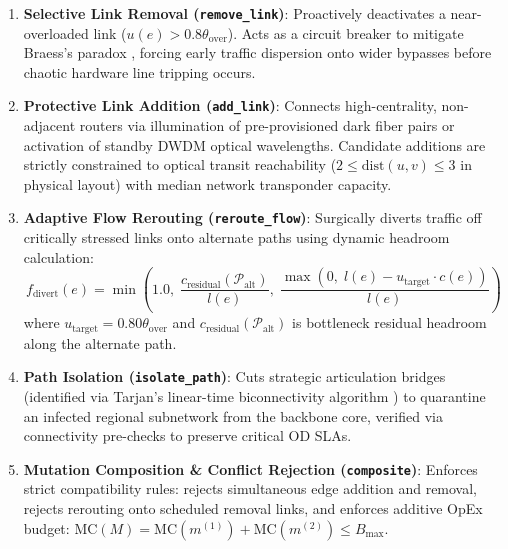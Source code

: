 \documentclass[pdflatex,sn-mathphys-num]{sn-jnl}
\theoremstyle{thmstyleone}
\theoremstyle{thmstyletwo}
\theoremstyle{thmstylethree}
\begin{document}
\begin{enumerate}
    \item \textbf{Selective Link Removal (\texttt{remove\_link})}: Proactively deactivates a near-overloaded link ($u(e) > 0.8 \theta_{\mathrm{over}}$). Acts as a circuit breaker to mitigate Braess's paradox \cite{roughgarden2002bad}, forcing early traffic dispersion onto wider bypasses before chaotic hardware line tripping occurs.
    \item \textbf{Protective Link Addition (\texttt{add\_link})}: Connects high-centrality, non-adjacent routers via illumination of pre-provisioned dark fiber pairs or activation of standby DWDM optical wavelengths. Candidate additions are strictly constrained to optical transit reachability ($2 \le \mathrm{dist}(u, v) \le 3$ in physical layout) with median network transponder capacity.
    \item \textbf{Adaptive Flow Rerouting (\texttt{reroute\_flow})}: Surgically diverts traffic off critically stressed links onto alternate paths using dynamic headroom calculation:
    \begin{equation}
    f_{\mathrm{divert}}(e) = \min\left(1.0, \; \frac{c_{\mathrm{residual}}(\mathcal{P}_{\mathrm{alt}})}{l(e)}, \; \frac{\max(0, \; l(e) - u_{\mathrm{target}} \cdot c(e))}{l(e)}\right)
    \end{equation}
    where $u_{\mathrm{target}} = 0.80 \theta_{\mathrm{over}}$ and $c_{\mathrm{residual}}(\mathcal{P}_{\mathrm{alt}})$ is bottleneck residual headroom along the alternate path.
    \item \textbf{Path Isolation (\texttt{isolate\_path})}: Cuts strategic articulation bridges (identified via Tarjan's linear-time biconnectivity algorithm \cite{tarjan1972depth}) to quarantine an infected regional subnetwork from the backbone core, verified via connectivity pre-checks to preserve critical OD SLAs.
    \item \textbf{Mutation Composition \& Conflict Rejection (\texttt{composite})}: Enforces strict compatibility rules: rejects simultaneous edge addition and removal, rejects rerouting onto scheduled removal links, and enforces additive OpEx budget: $\mathrm{MC}(M) = \mathrm{MC}(m^{(1)}) + \mathrm{MC}(m^{(2)}) \le B_{\max}$.
\end{enumerate}
\end{document}
